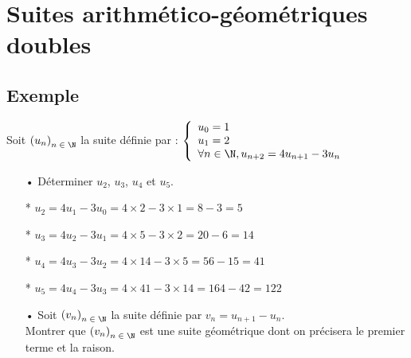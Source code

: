 \ifdefined\COMPLETE
\else
    
    
\fi


\section{Suites arithmético-géométriques doubles}

\subsection{Exemple }

Soit $\left(u_n\right)_{n\; \in \; \N}$ la suite définie par : $\left\{
  \begin{array}{lll}
    u_0 = 1 \\
    u_1 = 2 \\
    \forall n \in \N, u_{n+2} = 4u_{n+1} - 3u_n
  \end{array}
\right.$

\vspace*{.3cm}

\begin{itemize}
\item[•] Déterminer $u_2$, $u_3$, $u_4$ et $u_5$. \\
\end{itemize}

\begin{itemize}
\item[*] $u_2 = 4u_1 - 3u_0 = 4 \times 2 - 3 \times 1 = 8 - 3 = 5$ \\
\item[*] $u_3 = 4u_2 - 3u_1 = 4 \times 5 - 3 \times 2 = 20 - 6 = 14$ \\
\item[*] $u_4 = 4u_3 - 3u_2 = 4 \times 14 - 3 \times 5 = 56 - 15 = 41$ \\
\item[*] $u_5 = 4u_4 - 3u_3 = 4 \times 41 - 3 \times 14 = 164 - 42 = 122$ \\
\end{itemize}

\vspace*{.3cm}

\begin{itemize}
\item[•] Soit $\left(v_n\right)_{n\; \in \; \N}$ la suite définie par $v_n = u_{n+1} - u_n$. \\ Montrer que $\left(v_n\right)_{n\; \in \; \N}$ est une suite géométrique dont on précisera le premier terme et la raison.
\end{itemize}

